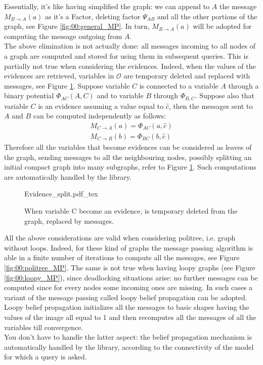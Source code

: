 Essentially, it's like having simplified the graph: we can append to $A$ the message $M _{B \rightarrow A}(a)$ as it's a Factor, deleting factor $\Psi _{AB}$ and all the other portions of the graph, see Figure \ref{fig:00:general_MP}.
In turn, $M _{B \rightarrow A}(a)$ will be adopted for computing the message outgoing from $A$.
\\
The above elimination is not actually done: all messages incoming to all nodes of a graph are computed and stored for using them in subsequent queries. This is partially not true when considering the evidences. Indeed, when the values of the evidences are retrieved, variables in $\mathcal{O}$ are temporary deleted and replaced with messages, see Figure \ref{fig:00:evidence_split}. Suppose variable $C$ is connected to a variable $A$ through a binary potential $\Phi _{AC}(A,C)$ and to variable $B$ through $\Phi _{B,C}$. Suppose also that variable $C$ is an evidence assuming a value equal to $\hat{c}$, then the messages sent to $A$ and $B$ can be computed independently as follows:
\begin{eqnarray}
M _{C \rightarrow A}(a) = \Phi _{AC}(a, \hat{c}) \nonumber\\
M _{C \rightarrow B}(b) = \Phi _{BC}(b, \hat{c})
\end{eqnarray}
Therefore all the variables that become evidences can be considered as leaves of the graph, sending messages to all the neighbouring nodes, possibly splitting an initial compact graph into many subgraphs,  refer to Figure \ref{fig:00:evidence_split}. Such computations are automatically handled by the library.

\begin{figure}
	\centering
\def\svgwidth{0.65 \textwidth}
{Evidence_split.pdf_tex}
	\caption{When variable C become an evidence, is temporary deleted from the graph, replaced by messages.}
	\label{fig:00:evidence_split}
\end{figure}  

All the above considerations are valid when considering politree, i.e. graph without loops. Indeed, for these kind of graphs the message passing algorithm is able in a finite number of iterations to compute all the messages, see Figure \ref{fig:00:politree_MP}.
The same is not true when having loopy graphs (see Figure \ref{fig:00:loopy_MP}), since deadlocking situations arise: no further messages can be computed since for every nodes some incoming ones are missing.
In such cases a variant of the message passing called loopy belief propagation can be adopted. Loopy belief propagation initializes all the messages to basic shapes having the values of the image all equal to 1 and then recomputes all the messages of all the variables till convergence.
\\
You don't have to handle the latter aspect: the belief propagation mechanism is automatically handled by the library, according to the connectivity of the model for which a query is asked.


